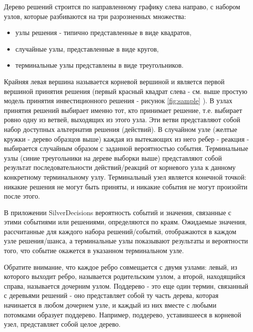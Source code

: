 Дерево решений строится по направленному графику слева направо, с набором узлов, которые разбиваются на три разрозненных множества:
\begin{itemize}
    \item узлы решения - типично представленные в виде квадратов,
    \item случайные узлы, представленные в виде кругов,
    \item терминальные узлы представлены в виде треугольников.
\end{itemize}

Крайняя левая вершина называется корневой вершиной и является первой вершиной принятия решения (первый красный квадрат слева - см. выше простую модель принятия инвестиционного решения - рисунок \ref{fig:sample} ). В узлах принятия решений выбирает именно тот, кто принимает решение, т.е. выбирает ровно одну из ветвей, выходящих из этого узла. Эти ветви представляют собой набор доступных альтернатив решения (действий). В случайном узле (желтые кружки - дерево образцов выше) каждая из вытекающих из него ребер - реакция - выбирается случайным образом с заданной вероятностью события. Терминальные узлы (синие треугольники на дереве выборки выше) представляют собой результат последовательности действий/реакций от корневого узла к данному конкретному терминальному узлу. Терминальный узел является конечной точкой: никакие решения не могут быть приняты, и никакие события не могут произойти после этого.

В приложении SilverDecisions вероятность событий и значения, связанные с этими событиями или решениями, определяются по краям. Ожидаемые значения, рассчитанные для каждого набора решений/событий, отображаются в каждом узле решения/шанса, а терминальные узлы показывают результаты и вероятности того, что событие окажется в указанном терминальном узле.

Обратите внимание, что каждое ребро совмещается с двумя узлами: левый, из которого выходит ребро, называется родительским узлом, а второй, находящийся справа, называется дочерним узлом. Поддерево - это еще один термин, связанный с деревьями решений - оно представляет собой ту часть дерева, которая начинается в любом дочернем узле, и каждый из них вместе с любыми потомками образует поддерево. Например, поддерево, уставившееся в корневой узел, представляет собой целое дерево.




